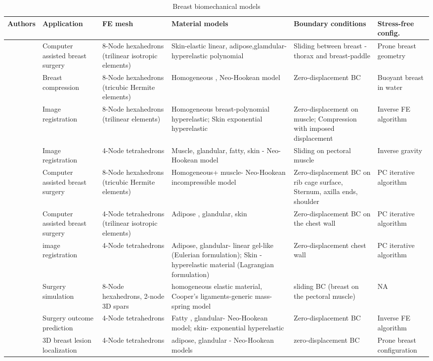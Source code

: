 
\begin{sidewaystable}[!h]
    \centering
    \small
   \begin{tabularx}{22cm}{|p{2.5cm}|p{2.5cm}|p{3.5cm}|X|p{3.5cm}|p{2.5cm}|}
   \hline
   Authors & Application & FE mesh & Material models & Boundary conditions & Stress-free config. \\
\hline
   \cite{azar_methods_2002} &  Computer assisted breast surgery & 8-Node hexahedrons (trilinear isotropic elements) & Skin-elastic linear, 
   adipose,glamdular-hyperelastic polynomial & Sliding between breast - thorax and breast-paddle & Prone breast geometry\\
   \hline
   \cite{rajagopal_modelling_2007} & Breast compression & 8-Node hexahedrons (tricubic Hermite elements)& Homogeneous , Neo-Hookean model& Zero-displacement BC & Buoyant breast in water \\
   \hline
   \cite{pathmanathan_predicting_2008}&Image registration & 8-Node hexahedrons (trilinear elements)& Homogeneous breast-polynomial hyperelastic; Skin exponential hyperelastic  & Zero-displacement on muscle; Compression with imposed displacement & Inverse FE algorithm \\
   \hline
   \cite{han_nonlinear_2014}& Image registration& 4-Node tetrahedrons & Muscle, glandular, fatty, skin - Neo-Hookean model & Sliding on pectoral muscle & Inverse gravity \\
   \hline
   \cite{gamage_modelling_2012}&  Computer assisted breast surgery & 8-Node hexahedrons (tricubic Hermite elements) & Homogeneous+ muscle- Neo-Hookean incompressible model& Zero-displacement BC on rib cage surface, Sternum, axilla ends, shoulder & PC iterative algorithm \\
   \hline
   \cite{patete_multi_2013}& Computer assisted breast surgery& 4-Node tetrahedrons (trilinear isotropic elements) & Adipose , glandular, skin & Zero-displacement BC on the  chest wall&PC iterative algorithm\\
   \hline
   \cite{kuhlmann_mechanical_2013}& image registration & 4-Node tetrahedrons & Adipose, glandular- linear gel-like (Eulerian formulation); Skin - hyperelastic material (Lagrangian formulation) & Zero-displacement chest wall& PC iterative algorithm\\
   \hline
   
   \cite{georgii_simulation_2016}&Surgery simulation & 8-Node hexahedrons, 2-node 3D spars & homogeneous elastic material, Cooper's ligaments-generic mass-spring model & sliding BC (breast on the pectoral muscle) & NA\\
   \hline
   \cite{eiben_surface_2016} & Surgery outcome prediction & 4-Node tetrahedrons & Fatty , glandular- Neo-Hookean model; skin- exponential hyperelastic & Zero-displacement BC & Inverse FE algorithm \\ 
   \hline
   \citep{garcia_mapping_2017} & 3D breast lesion localization & 4-Node tetrahedrons & adipose, glandular  - Neo-Hookean models &zero-displacement BC & Prone breast configuration\\
   \hline
    \end{tabularx}
     \caption{Breast biomechanical models}
     \label{table:mechanical_models_table}
\end{sidewaystable}


